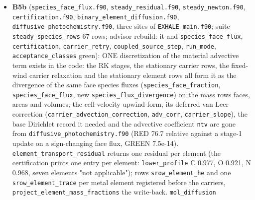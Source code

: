 \documentclass[english,a4paper]{my_memo}
\begin{document}
\begin{itemize}
  is a marching snapshot and \texttt{cert\_tol\_carrier}/\texttt{cert\_tol\_element} still
  have no anchor (contract section 11 records two rows from solves that did
  not meet their target, 7.46e-3 and 5.82e-3, not anchors). \textbf{Open, and a
  physical-consistency defect:} the stationary carrier row still uses the
  cell-velocity advective form while the marching rows ride on
  \texttt{F\_rho\ Y\_s\^{}face\ /\ m\_s} since B4-1c (two operators, two fixed points): B5b.
  Also open: the element rows (\texttt{element\_transport\_residual} must return a
  residual per element, not the worst at each cell), the cell\textquotesingle s own field
  in the cell residual (interface written: FIELD-SELF), reload consistency,
  three \texttt{EXHALE\_main.f90} sites (the registry name, \texttt{EXHALE\_JAC\_TEST}
  coverage, the PTC refusal text).
\item
  \textbf{B5b} (\texttt{species\_face\_flux.f90}, \texttt{steady\_residual.f90}, \texttt{steady\_newton.f90},
  \texttt{certification.f90}, \texttt{binary\_element\_diffusion.f90},
  \texttt{diffusive\_photochemistry.f90}, three sites of \texttt{EXHALE\_main.f90}; suite
  \texttt{steady\_species\_rows} 67 rows; advisor rebuild: it and \texttt{species\_face\_flux},
  \texttt{certification}, \texttt{carrier\_retry}, \texttt{coupled\_source\_step}, \texttt{run\_mode},
  \texttt{acceptance\_classes} green): ONE discretization of the material advective
  term exists in the code: the RK stages, the stationary carrier rows, the
  fixed-wind carrier relaxation and the stationary element rows all form it
  as the divergence of the same face species fluxes (\texttt{species\_face\_fraction},
  \texttt{species\_face\_flux}, new \texttt{species\_flux\_divergence}) on the mass row\textquotesingle s faces,
  areas and volumes; the cell-velocity upwind form, its deferred van Leer
  correction (\texttt{carrier\_advection\_correction}, \texttt{adv\_corr}, \texttt{carrier\_slope}), the
  base Dirichlet record it needed and the advective coefficient \texttt{ntv} are
  gone from \texttt{diffusive\_photochemistry.f90} (RED 76.7 relative against a
  stage-1 update on a sign-changing face flux, GREEN 7.5e-14).
  \texttt{element\_transport\_residual} returns one residual per element (the
  certification prints one entry per element: \texttt{lower\_profile} C 0.977, O
  0.921, N 0.968, seven elements "not applicable"); rows \texttt{srow\_element\_he}
  and one \texttt{srow\_element\_trace} per metal element registered before the
  carriers, \texttt{project\_element\_mass\_fractions} the write-back. \texttt{mol\_diffusion}

\end{itemize}
\end{document}
